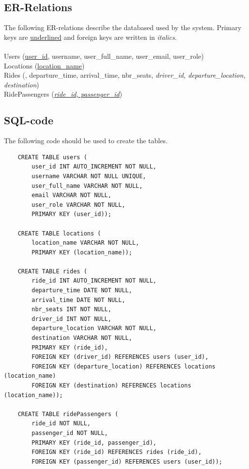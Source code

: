 \documentclass{article}
\begin{document}
\subsection{ER-Relations}
The following ER-relations describe the databased used by the system. Primary keys are \underline{underlined} and foreign keys are written in \textit{italics}.
\\ \\
Users (\underline{user\_id}, username, user\_full\_name, user\_email, user\_role)
\\
Locations (\underline{location\_name})
\\
Rides (, departure\_time, arrival\_time, nbr\_seats, \textit{driver\_id, departure\_location, destination})
\\
RidePassengers (\underline{\textit{ride\_id, passenger\_id}})

\subsection{SQL-code}
The following code should be used to create the tables.

\begin{verbatim}
    CREATE TABLE users (
        user_id INT AUTO_INCREMENT NOT NULL,
        username VARCHAR NOT NULL UNIQUE,
        user_full_name VARCHAR NOT NULL,
        email VARCHAR NOT NULL,
        user_role VARCHAR NOT NULL,
        PRIMARY KEY (user_id));
    
    CREATE TABLE locations (
        location_name VARCHAR NOT NULL,
        PRIMARY KEY (location_name));
        
    CREATE TABLE rides (
        ride_id INT AUTO_INCREMENT NOT NULL,
        departure_time DATE NOT NULL,
        arrival_time DATE NOT NULL,
        nbr_seats INT NOT NULL,
        driver_id INT NOT NULL,
        departure_location VARCHAR NOT NULL,
        destination VARCHAR NOT NULL,
        PRIMARY KEY (ride_id),
        FOREIGN KEY (driver_id) REFERENCES users (user_id),
        FOREIGN KEY (departure_location) REFERENCES locations (location_name)
        FOREIGN KEY (destination) REFERENCES locations (location_name));
    
    CREATE TABLE ridePassengers (
        ride_id NOT NULL,
        passenger_id NOT NULL,
        PRIMARY KEY (ride_id, passenger_id),
        FOREIGN KEY (ride_id) REFERENCES rides (ride_id),
        FOREIGN KEY (passenger_id) REFERENCES users (user_id));
        
\end{verbatim}
\end{document}
